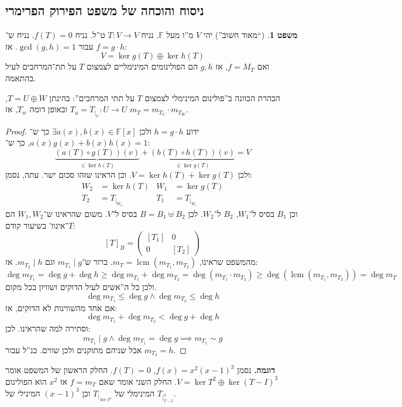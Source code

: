 \documentclass[a4paper]{article}
\DeclareMathOperator{\lcm}     {lcm}
\newcommand\F         {\mathbb{F}}
\newcommand\co        {\colon}
\newcommand\pms[1]    {\begin{pmatrix}
		#1
\end{pmatrix}}
\newcommand\dequad    {\!\!\!\!\!\!}
\theoremstyle{definition}
\newtheorem{Theorem}{משפט}
\newcommand\theo  [1] {\begin{Theorem}#1\end{Theorem}}
\begin{document}
	\subsection{ניסוח והוכחה של משפט הפירוק הפרימרי}
	\theo{(``מאוד חשוב'') יהי $V$ מ''ו מעל $\F$. נניח $T \co V \to V$ ט''ל. נניח $f(T) = 0$. נניח ש־$f = g \cdot h$ עבור $\gcd(g, h) = 1$. אז: 
		\[ V = \ker g(T) \oplus \ker h(T) \]
		ואם $f = M_T$, אז $g, h$ הם הפולינומים המינימליים לצמצום $T$ על תת־המרחבים לעיל בהתאמה. 
	}
	הבהרת הכוונה ב''פולינום המינימלי לצמצום $T$ על תתי המרחבים'': בהינתן $T = U \oplus W$, $T_u = T_{\mid_U} \co U \to U$ ובאופן דומה $T_w$, אז $m_T = m_{T_U} \cdot m_{T_W}$. 
	\begin{proof}
		ידוע $h= g \cdot h$ ולכן $\exists a(x), b(x) \in \F[x]$ כך ש־$a(x)g(x) + b(x)h(x) = 1$, כך ש־: 
		\[ \underbrace{(a(T) \circ g(T))(v)}_{\in \ker h(T)} + \underbrace{(b(T) \circ h(T))(v)}_{\in \ker g(T)} = V \]
		ולכן $V = \ker h(T) + \ker g(T)$. 
		וכן הראינו שזהו סכום ישר. עתה, נסמן: 
		\begin{align*}
			W_2 &= \ker h(T) \dequad&\dequad W_1 &= \ker g(T) \\
			T_2 &=  T_{|_{W_2}} \dequad&\dequad T_1 &= T_{|_{W_1}}
		\end{align*}
		וכן $B_1$ בסיס ל־$W_1$, $B_2$ ל־$W_2$. לכן $B = B_1 \uplus B_2$ בסיס ל־$V$. משום שהראינו ש־$W_1, W_2$ הם $T$־אינוו' בשיעור קודם: 
		\[ [T]_B = \pms{[T_1] & 0 \\ 0 & [T_2]} \]
		מהמשפט שראינו, $m_T = \lcm(m_{T_1}, m_{T_2})$. ברור ש־$m_{T_1} \mid g$ וגם $m_{T_2} \mid h$. אז: 
		\[ \deg m_{T_1} = \deg g + \deg h \ge \deg m_{T_1} + \deg m_{T_2} = \deg(m_{T_1} \cdot m_{T_2}) \ge \deg(\lcm(m_{T_1}, m_{T_2})) = \deg m_T \]
		ולכן כל ה''אשים לעיל הדוקים ושוויון בכל מקום. 
		\[ \deg m_{T_1} \le \deg g \land \deg m_{T_2} \le \deg h \]
		אם אחד מהשווינות לא הדוקים, אז: 
		\[ \deg m_{T_1} + \deg m_{T_2} < \deg g + \deg h \]
		וסתירה למה שהראינו. לכן: 
		\[ m_{T_1} \mid g \land \deg m_{T_1} = \deg g \implies m_{T_1} \sim g \]
		אבל שניהם מתוקנים ולכן שווים. כנ''ל עבור $m_{T_2} = h$. 
	\end{proof}
	
	
	\textbf{דוגמה. }נסמן $f(x) = x^{2}(x - 1)^{3}$, $f(T) = 0$. החלק הראשון של המשפט אומר $V = \ker T^2 \oplus \ker (T - I)^3$. החלק השני אומר שאם $f = m_T$ אז $x^2$ הוא הפולינום המינימלי של $T_{|_{\ker T^2}}$ וכן $(x - 1)^{3}$ המינילי של $T_{|_{T - I}^{3}}$. 
	
\end{document}
